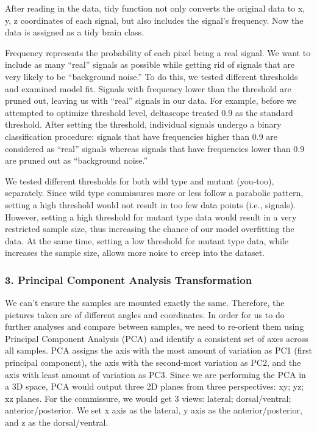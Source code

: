 \documentclass[10pt,letterpaper]{article}
\begin{document}
After reading in the data, tidy function not only converts the original
data to x, y, z coordinates of each signal, but also includes the
signal's frequency. Now the data is assigned as a tidy brain class.

Frequency represents the probability of each pixel being a real signal.
We want to include as many ``real'' signals as possible while getting
rid of signals that are very likely to be ``background noise.'' To do
this, we tested different thresholds and examined model fit. Signals
with frequency lower than the threshold are pruned out, leaving us with
``real'' signals in our data. For example, before we attempted to
optimize threshold level, deltascope treated 0.9 as the standard
threshold. After setting the threshold, individual signals undergo a
binary classification procedure: signals that have frequencies higher
than 0.9 are considered as ``real'' signals whereas signals that have
frequencies lower than 0.9 are pruned out as ``background noise.''

We tested different thresholds for both wild type and mutant (you-too),
separately. Since wild type commissures more or less follow a parabolic
pattern, setting a high threshold would not result in too few data
points (i.e., signals). However, setting a high threshold for mutant
type data would result in a very restricted sample size, thus increasing
the chance of our model overfitting the data. At the same time, setting
a low threshold for mutant type data, while increases the sample size,
allows more noise to creep into the dataset.

\subsubsection{3. Principal Component Analysis
Transformation}\label{principal-component-analysis-transformation}

We can't ensure the samples are mounted exactly the same. Therefore, the
pictures taken are of different angles and coordinates. In order for us
to do further analyses and compare between samples, we need to re-orient
them using Principal Component Analysis (PCA) and identify a consistent
set of axes across all samples. PCA assigns the axis with the most
amount of variation as PC1 (first principal component), the axis with
the second-most variation as PC2, and the axis with least amount of
variation as PC3. Since we are performing the PCA in a 3D space, PCA
would output three 2D planes from three perspectives: xy; yz; xz planes.
For the commissure, we would get 3 views: lateral; dorsal/ventral;
anterior/posterior. We set x axis as the lateral, y axis as the
anterior/posterior, and z as the dorsal/ventral.
\end{document}
